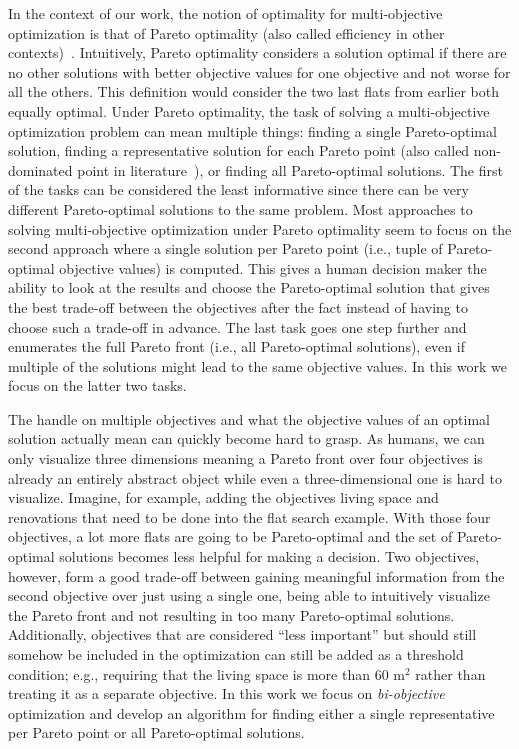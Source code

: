 In the context of our work, the notion of optimality for multi-objective optimization is that of Pareto optimality (also called efficiency in other contexts)~\autocite{Ehrgott2005-2}.
Intuitively, Pareto optimality considers a solution optimal if there are no other solutions with better objective values for one objective and not worse for all the others. 
This definition would consider the two last flats from earlier both equally optimal.
Under Pareto optimality, the task of solving a multi-objective optimization problem can mean multiple things:
finding a single Pareto-optimal solution, finding a representative solution for each Pareto point (also called non-dominated point in literature~\autocite{Ehrgott2005-2}), or finding all Pareto-optimal solutions.
The first of the tasks can be considered the least informative since there can be very different Pareto-optimal solutions to the same problem.
Most approaches to solving multi-objective optimization under Pareto optimality seem to focus on the second approach where a single solution per Pareto point (i.e., tuple of Pareto-optimal objective values) is computed.
This gives a human decision maker the ability to look at the results and choose the Pareto-optimal solution that gives the best trade-off between the objectives after the fact instead of having to choose such a trade-off in advance.
The last task goes one step further and enumerates the full Pareto front (i.e., all Pareto-optimal solutions), even if multiple of the solutions might lead to the same objective values.
In this work we focus on the latter two tasks.

The handle on multiple objectives and what the objective values of an optimal solution actually mean can quickly become hard to grasp.
As humans, we can only visualize three dimensions meaning a Pareto front over four objectives is already an entirely abstract object while even a three-dimensional one is hard to visualize.
Imagine, for example, adding the objectives living space and renovations that need to be done into the flat search example.
With those four objectives, a lot more flats are going to be Pareto-optimal and the set of Pareto-optimal solutions becomes less helpful for making a decision.
Two objectives, however, form a good trade-off between gaining meaningful information from the second objective over just using a single one, being able to intuitively visualize the Pareto front and not resulting in too many Pareto-optimal solutions.
Additionally, objectives that are considered ``less important'' but should still somehow be included in the optimization can still be added as a threshold condition;
e.g., requiring that the living space is more than 60 $\text{m}^2$ rather than treating it as a separate objective.
In this work we focus on \emph{bi-objective} optimization and develop an algorithm for finding either a single representative per Pareto point or all Pareto-optimal solutions.

